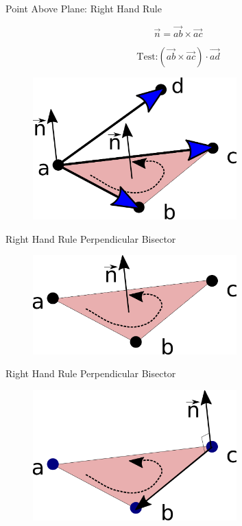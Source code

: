 \documentclass{beamer}
\begin{document}
\begin{frame}{Point Above Plane: Right Hand Rule}

\[ \vec{n} = \vec{ab} \times \vec{ac} \]

\[ \text{Test:} (\vec{ab} \times \vec{ac}) \cdot \vec{ad}\]

\begin{figure}[t]
	\centering
    \includegraphics[width=0.7\textwidth]{pointAbovePlaneAnswer.pdf}
\end{figure}
\end{frame}


\begin{frame}{Right Hand Rule Perpendicular Bisector}

\begin{figure}[t]
	\centering
    \includegraphics[width=0.7\textwidth]{3DTriangle.pdf}
\end{figure}

\end{frame}

\begin{frame}{Right Hand Rule Perpendicular Bisector}

\begin{figure}[t]
	\centering
    \includegraphics[width=0.7\textwidth]{3DTriangle2.pdf}
\end{figure}

\end{frame}
\end{document}
